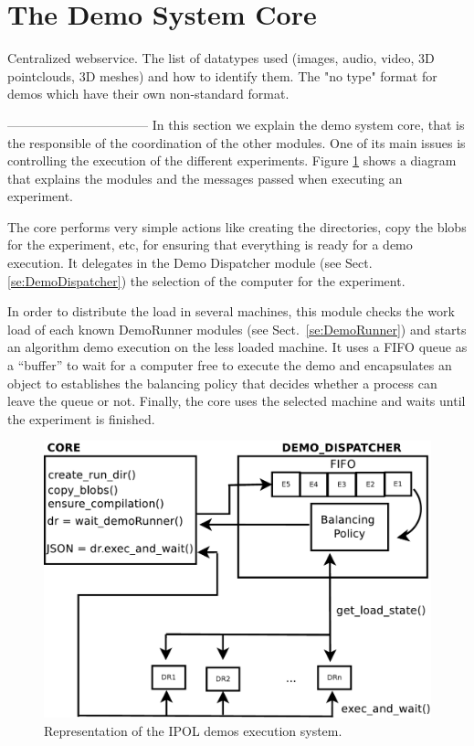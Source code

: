 \section{The Demo System Core}
Centralized webservice.
The list of datatypes used (images, audio, video, 3D pointclouds, 3D meshes) and how to identify them. The "no type" format for demos which have their own non-standard format.

\newline
---------------------------------
\newline
In this section we explain the demo system core, that is the responsible of the coordination of the other modules. One of its main issues is controlling the execution of the different experiments. Figure \ref{fig:core_diagram} shows a diagram that explains the modules and the messages passed when executing an experiment.

The core performs very simple actions like creating the directories, copy the blobs for the experiment, etc, for ensuring that everything is ready for a demo execution. It delegates in the Demo Dispatcher module (see Sect.\ref{se:DemoDispatcher}) the selection of the computer for the experiment. 

In order to distribute the load in several machines, this module checks the work load of each known DemoRunner modules (see Sect.~\ref{se:DemoRunner}) and starts an algorithm demo execution on the less loaded machine. It uses a FIFO queue as a ``buffer'' to wait for a computer free to execute the demo and encapsulates an object to establishes the balancing policy that decides whether a process can leave the queue or not. Finally, the core uses the selected machine and waits until the experiment is finished. 


\begin{figure}[!ht]
\centering
\includegraphics[width=0.7\columnwidth]{core/images/core_diagram.pdf}
\caption{Representation of the IPOL demos execution system.} 
\label{fig:core_diagram}
\end{figure}


